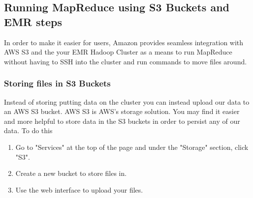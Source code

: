 \documentclass{article}
\begin{document}
 
\subsection{Running MapReduce using S3 Buckets and EMR steps}
In order to make it easier for users, Amazon provides seamless integration with AWS S3 and the your EMR Hadoop Cluster as a means to run MapReduce without having to SSH into the cluster and run commands to move files around.
\subsubsection{Storing files in S3 Buckets}
Instead of storing putting data on the cluster you can instead upload our data to an AWS S3 bucket. AWS S3 is AWS's storage solution. You may find it easier and more helpful to store data in the S3 buckets in order to persist any of our data. To do this
\begin{enumerate} 
    \item Go to "Services" at the top of the page and under the "Storage" section, click "S3". 
    \item Create a new bucket to store files in. 
    \item Use the web interface to upload your files.
\end{enumerate}
\end{document}
